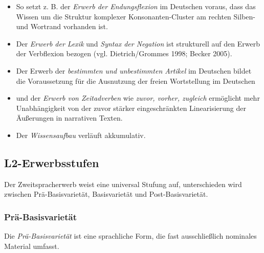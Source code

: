 \documentclass[
  letterpaper,
]{scrbook}
\providecommand{\tightlist}{%
  \setlength{\itemsep}{0pt}\setlength{\parskip}{0pt}}\usepackage{longtable,booktabs,array}
\begin{document}
\begin{itemize}
\tightlist
\item
  So setzt z. B. der \emph{Erwerb der Endungsflexion} im Deutschen
  voraus, dass das Wissen um die Struktur komplexer Konsonanten-Cluster
  am rechten Silben- und Wortrand vorhanden ist.\\
\item
  Der \emph{Erwerb der Lexik} und \emph{Syntax der Negation} ist
  strukturell auf den Erwerb der Verbflexion bezogen (vgl.
  Dietrich/Grommes 1998; Becker 2005).\\
\item
  Der Erwerb der \emph{bestimmten und unbestimmten Artikel} im Deutschen
  bildet die Voraussetzung für die Ausnutzung der freien Wortstellung im
  Deutschen\\
\item
  und der \emph{Erwerb von Zeitadverben} wie \emph{zuvor, vorher,
  zugleich} ermöglicht mehr Unabhängigkeit von der zuvor stärker
  eingeschränkten Linearisierung der Äußerungen in narrativen Texten.\\
\item
  Der \emph{Wissensaufbau} verläuft akkumulativ.
\end{itemize}

\hypertarget{l2-erwerbsstufen}{%
\subsection{L2-Erwerbsstufen}\label{l2-erwerbsstufen}}

Der Zweitspracherwerb weist eine universal Stufung auf, unterschieden
wird zwischen Prä-Basisvarietät, Basisvarietät und Post-Basisvarietät.

\hypertarget{pruxe4-basisvarietuxe4t}{%
\subsubsection{Prä-Basisvarietät}\label{pruxe4-basisvarietuxe4t}}

Die \emph{Prä-Basisvarietät} ist eine sprachliche Form, die fast
ausschließlich nominales Material umfasst.
\end{document}
